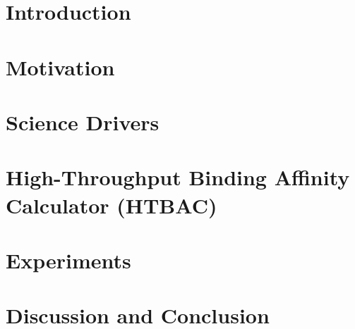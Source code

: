 \documentclass[conference]{IEEEtran}
\begin{document}
\section{Introduction}\label{sec:intro}



\section{Motivation}\label{sec:related-work}



\section{Science Drivers}\label{sec:science-drivers}




\section{High-Throughput Binding Affinity Calculator
(HTBAC)}\label{sec:htbac}



\section{Experiments}\label{sec:experiments}



\section{Discussion and Conclusion}\label{sec:discussion}

\end{document}
